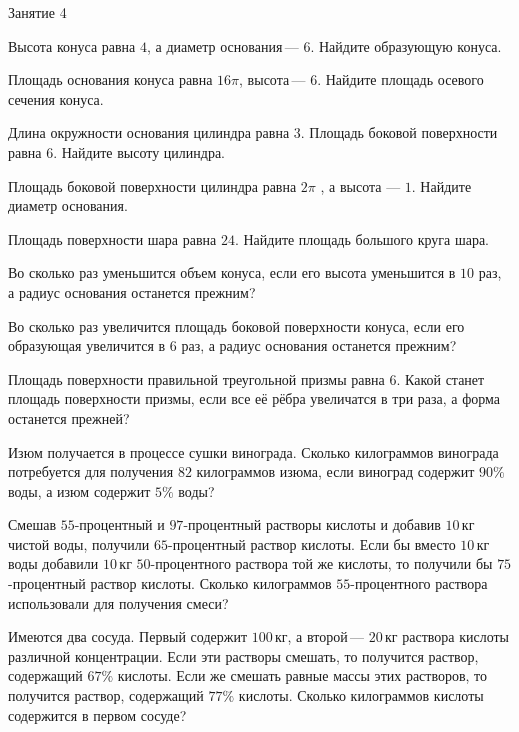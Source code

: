 \begin{class}[number=4]
	\begin{listofex}
		\item Занятие 4
	\end{listofex}
\end{class}

\begin{homework}[number=2]
	\begin{listofex}
		\item Высота конуса равна \(4\), а диаметр основания --- \(6\). Найдите образующую конуса.
		\item Площадь основания конуса равна \(16\pi \), высота --- \(6\). Найдите площадь осевого сечения конуса.
		\item Длина окружности основания цилиндра равна \(3\). Площадь боковой поверхности равна \(6\). Найдите высоту цилиндра.
		\item Площадь боковой поверхности цилиндра равна \(2\pi \) , а высота  --- \(1\). Найдите диаметр основания.
		\item Площадь поверхности шара равна \(24\). Найдите площадь большого круга шара.
		\item Во сколько раз уменьшится объем конуса, если его высота уменьшится в \(10\) раз, а радиус основания останется прежним?
		\item Во сколько раз увеличится площадь боковой поверхности конуса, если его образующая увеличится в \(6\) раз, а радиус основания останется прежним?
		\item Площадь поверхности правильной треугольной призмы равна \(6\). Какой станет площадь поверхности призмы, если все её рёбра увеличатся в три раза, а форма останется прежней?
		
		\item Изюм получается в процессе сушки винограда. Сколько килограммов винограда потребуется для получения \(82\) килограммов изюма, если виноград содержит \(90\%\) воды, а изюм содержит \(5\%\) воды?
		\item Смешав \(55\)-процентный и \(97\)-процентный растворы кислоты и добавив \(10\) кг чистой воды, получили \(65\)-процентный раствор кислоты. Если бы вместо \(10\) кг воды добавили \(10\) кг \(50\)-процентного раствора той же кислоты, то получили бы \(75\)-процентный раствор кислоты. Сколько килограммов \(55\)-процентного раствора использовали для получения смеси?
		\item Имеются два сосуда. Первый содержит \(100\) кг, а второй --- \(20\) кг раствора кислоты различной концентрации. Если эти растворы смешать, то получится раствор, содержащий \(67\%\) кислоты. Если же смешать равные массы этих растворов, то получится раствор, содержащий \(77\%\) кислоты. Сколько килограммов кислоты содержится в первом сосуде?
	\end{listofex}
\end{homework}

